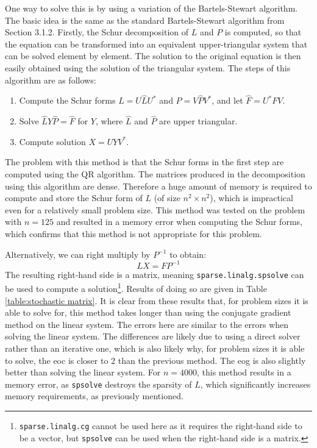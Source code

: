 \documentclass[11pt]{article}
\numberwithin{equation}{section}
\begin{document}
One way to solve this is by using a variation of the Bartels-Stewart algorithm. The basic idea is the same as the standard Bartels-Stewart algorithm from Section 3.1.2. Firstly, the Schur decomposition of $L$ and $P$ is computed, so that the equation can be transformed into an equivalent upper-triangular system that can be solved element by element. The solution to the original equation is then easily obtained using the solution of the triangular system. The steps of this algorithm are as follows:
\begin{enumerate}
\item Compute the Schur forms $L = U \hat{L} U^*$ and $P = V \hat{P} V^*$, and let $\hat{F} = U^* F V$.
\item Solve $\hat{L} Y \hat{P} = \hat{F}$ for $Y$, where $\hat{L}$ and $\hat{P}$ are upper triangular.
\item Compute solution $X = UYV^*$.
\end{enumerate}
The problem with this method is that the Schur forms in the first step are computed using the QR algorithm. The matrices produced in the decomposition using this algorithm are dense. Therefore a huge amount of memory is required to compute and store the Schur form of $L$ (of size $n^2 \times n^2$), which is impractical even for a relatively small problem size. This method was tested on the problem with $n=125$ and resulted in a memory error when computing the Schur forms, which confirms that this method is not appropriate for this problem.

Alternatively, we can right multiply by $P^{-1}$ to obtain:
\begin{equation}
LX = FP^{-1}
\end{equation}
The resulting right-hand side is a matrix, meaning \texttt{sparse.linalg.spsolve} can be used to compute a solution\footnote{\texttt{sparse.linalg.cg} cannot be used here as it requires the right-hand side to be a vector, but \texttt{spsolve} can be used when the right-hand side is a matrix.}. Results of doing so are given in Table \ref{table:stochastic matrix}. It is clear from these results that, for problem sizes it is able to solve for, this method takes longer than using the conjugate gradient method on the linear system. The errors here are similar to the errors when solving the linear system. The differences are likely due to using a direct solver rather than an iterative one, which is also likely why, for problem sizes it is able to solve, the eoc is closer to 2 than the previous method. The eog is also slightly better than solving the linear system. For $n=4000$, this method results in a memory error, as \texttt{spsolve} destroys the sparsity of $L$, which significantly increases memory requirements, as previously mentioned.
\end{document}
